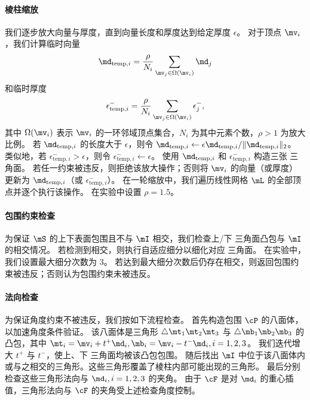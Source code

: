 \paragraph{棱柱缩放}
我们逐步放大向量与厚度，直到向量长度和厚度达到给定厚度 $\epsilon$。
%
对于顶点 $\mv_i$，我们计算临时向量 $$\md_{\text{temp},i} = \frac{\rho}{N_i} \sum_{\mv_j \in \Omega(\mv_i)} \md_j$$ 和临时厚度 $$\epsilon^{-}_{\text{temp},i} = \frac{\rho}{N_i} \sum_{\mv_j \in \Omega(\mv_i)} \epsilon^{-}_j,$$ 其中 $\Omega(\mv_i)$ 表示 $\mv_i$ 的一环邻域顶点集合，$N_i$ 为其中元素个数，$\rho > 1$ 为放大比例。
%
若 $\md_{\text{temp},i}$ 的长度大于 $\epsilon$，则令 $\md_{\text{temp},i} \leftarrow \epsilon \md_{\text{temp},i}/\|\md_{\text{temp},i}\|_2$。
类似地，若 $\epsilon^{-}_{\text{temp},i}  > \epsilon$，则令 $\epsilon^{-}_{\text{temp},i}  \leftarrow \epsilon$。
%
使用 $\md_{\text{temp},i}$ 和 $\epsilon^{-}_{\text{temp},i} $ 构造三张 \Bezier 三角面。
若任一约束被违反，则拒绝该放大操作；否则将 $\mv_i$ 的向量（或厚度）更新为 $\md_{\text{temp},i}$（或 $\epsilon^{-}_{\text{temp},i}$）。
%
在一轮缩放中，我们遍历线性网格 $\mL$ 的全部顶点并逐个执行该操作。
%
在实验中设置 $\rho = 1.5$。


\paragraph{包围约束检查}
为保证 $\mS$ 的上下表面包围且不与 $\mI$ 相交，我们检查上/下 \Bezier 三角面凸包与 $\mI$ 的相交情况。
%
若检测到相交，则执行自适应细分以细化对应 \Bezier 三角面。
在实验中，我们设置最大细分次数为 3。
%
若达到最大细分次数后仍存在相交，则返回包围约束被违反；否则认为包围约束未被违反。

\paragraph{法向检查}
为保证角度约束不被违反，我们按如下流程检查。
首先构造包围 $\cP$ 的八面体，以加速角度条件验证。
%
该八面体是三角形 $\triangle\mt_1\mt_2\mt_3$ 与 $\triangle\mb_1\mb_2\mb_3$ 的凸包，其中 $\mt_i=\mv_i+t^+ \md_i, \mb_i=\mv_i-t^- \md_i, i=1,2,3$。
我们迭代增大 $t^+$ 与 $t^-$，使上、下 \Bezier 三角面均被该凸包包围。 %
%
随后找出 $\mI$ 中位于该八面体内或与之相交的三角形。这些三角形覆盖了棱柱内部可能出现的三角形。
%
最后分别检查这些三角形法向与 $\md_i,i=1,2,3$ 的夹角。
由于 $\cF$ 是对 $\md_i$ 的重心插值，三角形法向与 $\cF$ 的夹角受上述检查角度控制。

